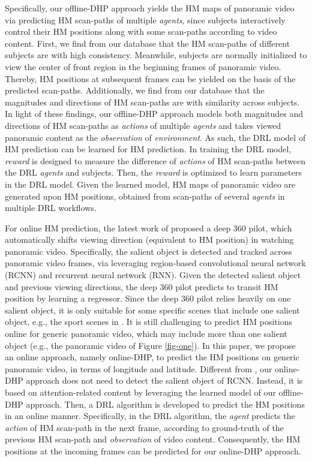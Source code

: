 \documentclass[10pt,journal,compsoc]{IEEEtran}
\begin{document}
Specifically, our offline-DHP approach yields the HM maps of panoramic video via predicting HM scan-paths of multiple \textit{agents}, since subjects interactively control their HM positions along with some scan-paths according to video content.
First, we find from our database that the HM scan-paths of different subjects are with high consistency.
Meanwhile, subjects are normally initialized to view the center of front region in the beginning frames of panoramic video.
Thereby, HM positions at subsequent frames can be yielded on the basis of the predicted scan-paths.
Additionally, we find from our database that the magnitudes and directions of HM scan-paths are with similarity across subjects.
In light of these findings, our offline-DHP approach models both magnitudes and directions of HM scan-paths as \textit{actions} of multiple \textit{agents} and takes viewed panoramic content as the \textit{observation} of \textit{environment}.
As such, the DRL model of HM prediction  can be learned for HM prediction.
In training the DRL model, \textit{reward} is designed to measure the difference of \textit{actions} of HM scan-paths between the DRL \textit{agents} and subjects. Then, the \textit{reward} is optimized to learn parameters in the DRL model.
Given the learned model, HM maps of panoramic video are generated upon HM positions, obtained from scan-paths of several \textit{agents} in multiple DRL workflows.


For online HM prediction, the latest work of \cite{hu2017deep} proposed a deep 360 pilot, which automatically shifts viewing direction (equivalent to HM position) in watching panoramic video. Specifically, the salient object is detected and tracked across panoramic video frames, via leveraging region-based convolutional neural network (RCNN) \cite{ren2015faster} and recurrent neural network (RNN). Given the detected salient object and previous viewing directions, the deep 360 pilot predicts to transit HM position by learning a regressor. Since the deep 360 pilot relies heavily on one salient object, it is only suitable for some specific scenes that include one salient object, e.g., the sport scenes in \cite{hu2017deep}. It is still challenging to predict HM positions online for generic panoramic video, which may include more than one salient object (e.g., the panoramic video of Figure \ref{fig-one}). In this paper, we propose an online approach, namely online-DHP, to predict the HM positions on generic panoramic video, in terms of longitude and latitude. Different from \cite{hu2017deep}, our online-DHP approach does not need to detect the salient object of RCNN. Instead, it is based on attention-related content by leveraging the learned model of our offline-DHP approach. Then, a DRL algorithm is developed to predict the HM positions in an online manner. Specifically, in the DRL algorithm, the \textit{agent} predicts the \textit{action} of HM scan-path in the next frame, according to ground-truth of the previous HM scan-path and \textit{observation} of video content. Consequently, the HM positions at the incoming frames can be predicted for our online-DHP approach.
\end{document}
